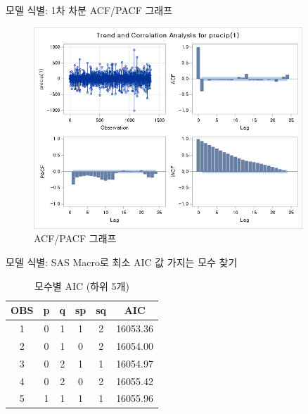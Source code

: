 \documentclass{beamer}
\begin{document}
\begin{frame}{모델 식별: 1차 차분 ACF/PACF 그래프}
    \begin{figure}
        \includegraphics[width=0.9\textwidth]{alldata_acf_1.png}
        \caption{ACF/PACF 그래프}
    \end{figure}
\end{frame}

\begin{frame}{모델 식별: SAS Macro로 최소 AIC 값 가지는 모수 찾기}
\begin{table}[h!]
\centering
\caption{모수별 AIC (하위 5개)}
\label{tab:model_comparison}
\begin{tabular}{cccccc}
\hline
\textbf{OBS} & \textbf{p} & \textbf{q} & \textbf{sp} & \textbf{sq} & \textbf{AIC} \\ \hline
1            & 0          & 1          & 1           & 2           & 16053.36     \\
2            & 0          & 1          & 0           & 2           & 16054.00     \\
3            & 0          & 2          & 1           & 1           & 16054.97     \\
4            & 0          & 2          & 0           & 2           & 16055.42     \\
5            & 1          & 1          & 1           & 1           & 16055.96     \\ \hline
\end{tabular}
\end{table}
\end{frame}
\end{document}
